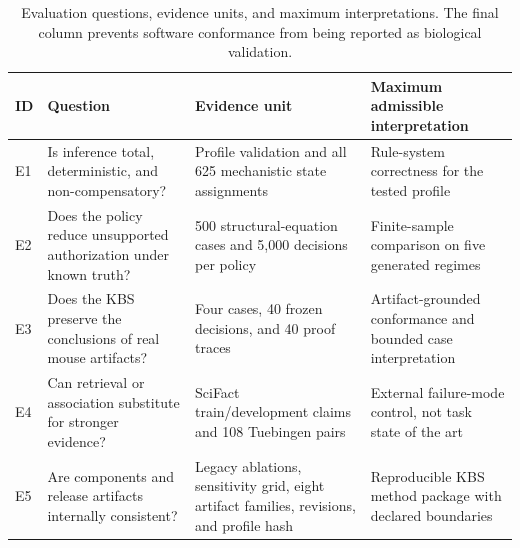 \begin{table}[t!]
\centering
\caption{Evaluation questions, evidence units, and maximum interpretations. The final column prevents software conformance from being reported as biological validation.}
\label{tab:experiment-design}
\footnotesize
\renewcommand{\arraystretch}{1.12}
\begin{tabularx}{\textwidth}{@{}p{}p{}p{}Y@{}}
\toprule
ID & Question & Evidence unit & Maximum admissible interpretation \\
\midrule
E1 & Is inference total, deterministic, and non-compensatory? & Profile validation and all 625 mechanistic state assignments & Rule-system correctness for the tested profile \\
\addlinespace[2pt]
E2 & Does the policy reduce unsupported authorization under known truth? & 500 structural-equation cases and 5,000 decisions per policy & Finite-sample comparison on five generated regimes \\
\addlinespace[2pt]
E3 & Does the KBS preserve the conclusions of real mouse artifacts? & Four cases, 40 frozen decisions, and 40 proof traces & Artifact-grounded conformance and bounded case interpretation \\
\addlinespace[2pt]
E4 & Can retrieval or association substitute for stronger evidence? & SciFact train/development claims and 108 Tuebingen pairs & External failure-mode control, not task state of the art \\
\addlinespace[2pt]
E5 & Are components and release artifacts internally consistent? & Legacy ablations, sensitivity grid, eight artifact families, revisions, and profile hash & Reproducible KBS method package with declared boundaries \\
\bottomrule
\end{tabularx}
\end{table}
